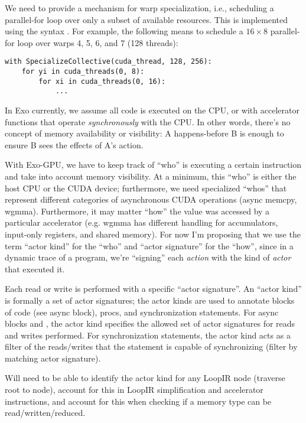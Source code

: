 \filbreak
{} We need to provide a mechanism for warp specialization, i.e., scheduling a parallel-for loop over only a subset of available resources.
This is implemented using the syntax .
For example, the following means to schedule a $16 \times 8$ parallel-for loop over warps 4, 5, 6, and 7 (128 threads):

{\color{lightttColor}
\begin{verbatim}
with SpecializeCollective(cuda_thread, 128, 256):
    for yi in cuda_threads(0, 8):
        for xi in cuda_threads(0, 16):
            ...
\end{verbatim}
}

\filbreak
{} In Exo currently, we assume all code is executed on the CPU, or with accelerator functions that operate \textit{synchronously} with the CPU.
In other words, there's no concept of memory availability or visibility: A happens-before B is enough to ensure B sees the effects of A's action.

\filbreak
With Exo-GPU, we have to keep track of ``who'' is executing a certain instruction and take into account memory visibility.
At a minimum, this ``who'' is either the host CPU or the CUDA device; furthermore, we need specialized ``whos'' that represent different categories of asynchronous CUDA operations (async memcpy, wgmma).
Furthermore, it may matter ``how'' the value was accessed by a particular accelerator (e.g. wgmma has different handling for accumulators, input-only registers, and shared memory).
For now I'm proposing that we use the term ``actor kind'' for the ``who'' and ``actor signature'' for the ``how'', since in a dynamic trace of a program, we're ``signing'' each \textit{action} with the kind of \textit{actor} that executed it.

\filbreak
Each read or write is performed with a specific ``actor signature''.
An ``actor kind'' is formally a set of actor signatures; the actor kinds are used to annotate blocks of code (see async block),  procs, and synchronization statements.
For async blocks and , the actor kind specifies the allowed set of actor signatures for reads and writes performed.
For synchronization statements, the actor kind acts as a filter of the reads/writes that the statement is capable of synchronizing (filter by matching actor signature).

\filbreak
{} Will need to be able to identify the actor kind for any LoopIR node (traverse root to node), account for this in LoopIR simplification and accelerator instructions, and account for this when checking if a memory type can be read/written/reduced.

